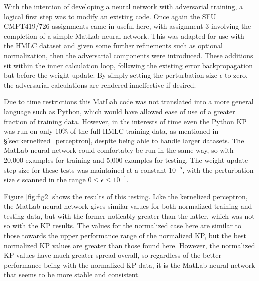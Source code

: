 \documentclass          {article} %
\begin{document}
With the intention of developing a neural network with adversarial training, a logical first step was to modify an existing code. Once again the SFU CMPT419/726 assignments came in useful here, with assignment-3 involving the completion of a simple MatLab neural network. This was adapted for use with the HMLC dataset and given some further refinements such as optional normalization, then the adversarial components were introduced. These additions sit within the inner calculation loop, following the existing error backpropagation but before the weight update. By simply setting the perturbation size $\epsilon$ to zero, the adversarial calculations are rendered inneffective if desired.

Due to time restrictions this MatLab code was not translated into a more general language such as Python, which would have allowed ease of use of a greater fraction of training data. However, in the interests of time even the Python KP was run on only 10\% of the full HMLC training data, as mentioned in \S\ref{sec:kernelized_perceptron}, despite being able to handle larger datasets. The MatLab neural network could comfortably be run in the same way, so with 20,000 examples for training and 5,000 examples for testing. The weight update step size for these tests was maintained at a constant $10^{-5}$, with the perturbation size $\epsilon$ scanned in the range $0\le\epsilon\le10^{-1}$.

Figure \ref{fig:fig2} shows the results of this testing. Like the kernelized perceptron, the MatLab neural network gives similar values for both normalized training and testing data, but with the former noticably greater than the latter, which was not so with the KP results. The values for the normalized case here are similar to those towards the upper performance range of the normalized KP, but the best normalized KP values are greater than those found here. However, the normalized KP values have much greater spread overall, so regardless of the better performance being with the normalized KP data, it is the MatLab neural network that seems to be more stable and consistent.
\end{document}
